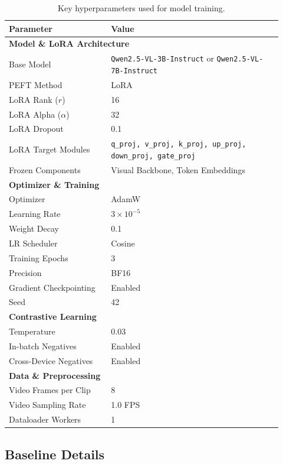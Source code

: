 \begin{table}[t]
\centering
\caption{Key hyperparameters used for model training.}
\label{gve:tab:training_hyperparameters}
\begin{tabular}{@{}p{0.34\linewidth}p{0.58\linewidth}@{}}
\toprule
\textbf{Parameter} & \textbf{Value} \\
\midrule
\multicolumn{2}{l}{\textbf{Model \& LoRA Architecture}} \\
Base Model & \texttt{Qwen2.5-VL-3B-Instruct} or \texttt{Qwen2.5-VL-7B-Instruct} \\
PEFT Method & LoRA \\
LoRA Rank (\(r\)) & 16 \\
LoRA Alpha (\(\alpha\)) & 32 \\
LoRA Dropout & 0.1 \\
LoRA Target Modules & \texttt{q\_proj, v\_proj, k\_proj, up\_proj, down\_proj, gate\_proj} \\
Frozen Components & Visual Backbone, Token Embeddings \\
\midrule
\multicolumn{2}{l}{\textbf{Optimizer \& Training}} \\
Optimizer & AdamW \\
Learning Rate & \(3 \times 10^{-5}\) \\
Weight Decay & 0.1 \\
LR Scheduler & Cosine \\
Training Epochs & 3 \\
Precision & BF16 \\
Gradient Checkpointing & Enabled \\
Seed & 42 \\
\midrule
\multicolumn{2}{l}{\textbf{Contrastive Learning}} \\
Temperature & 0.03 \\
In-batch Negatives & Enabled \\
Cross-Device Negatives & Enabled \\
\midrule
\multicolumn{2}{l}{\textbf{Data \& Preprocessing}} \\
Video Frames per Clip & 8 \\
Video Sampling Rate & 1.0 FPS \\
Dataloader Workers & 1 \\
\bottomrule
\end{tabular}
\end{table}




\subsection{Baseline Details}\label{gve:app:baseline_details}


